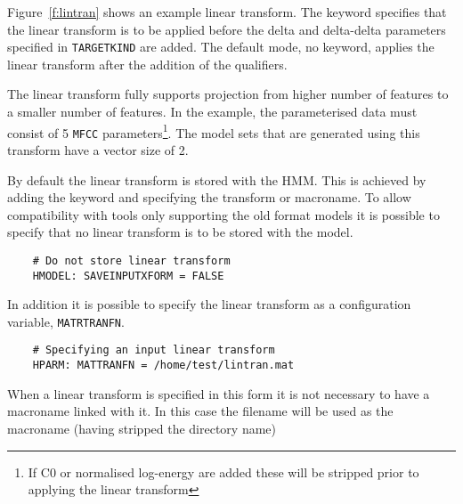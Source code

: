 Figure~\ref{f:lintran}  shows an example linear transform. The
 keyword specifies that the linear transform
is to be applied before the delta and delta-delta
parameters specified in \texttt{TARGETKIND} are added. The default
mode, no  keyword, applies the linear transform 
after the addition of the qualifiers.

The linear transform fully supports projection from higher 
number of features to a smaller number of features. In the 
example, the parameterised data must consist of 5 \texttt{MFCC}
parameters\footnote{If C0 or normalised log-energy are added
these will be stripped prior to applying the linear transform}.
The model sets that are generated using this transform have
a vector size of 2.

By default the linear transform is stored with the HMM. This is
achieved by adding the  keyword and specifying the
transform or macroname. To allow compatibility with tools only
supporting the old format models it is possible to specify that no
linear transform is to be stored with the model. 
\begin{verbatim}
    # Do not store linear transform
    HMODEL: SAVEINPUTXFORM = FALSE
\end{verbatim}
In addition it is possible to specify the linear transform as a
 configuration variable, \texttt{MATRTRANFN}.
\begin{verbatim}
    # Specifying an input linear transform
    HPARM: MATTRANFN = /home/test/lintran.mat
\end{verbatim}
When a linear transform is specified in this form it is not necessary
to have a macroname linked with it. In this case the filename
will be used as the macroname (having stripped the directory name)


